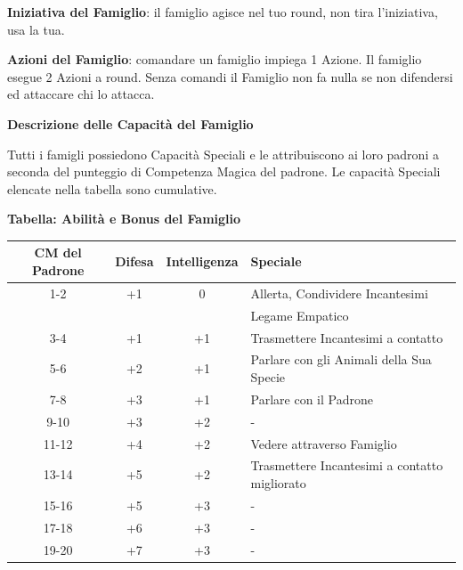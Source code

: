 \begin{multicols}{2}
\textbf{Iniziativa del Famiglio}: il famiglio agisce nel tuo round, non tira l'iniziativa, usa la tua.

\textbf{Azioni del Famiglio}: comandare un famiglio impiega 1 Azione. Il famiglio esegue 2 Azioni a round. Senza comandi il Famiglio non fa nulla se non difendersi ed attaccare chi lo attacca.

\textbf{Descrizione delle Capacità del Famiglio}

Tutti i famigli possiedono Capacità Speciali e le attribuiscono ai loro padroni a seconda del punteggio di Competenza Magica del padrone. Le capacità Speciali elencate nella tabella sono cumulative.

\end{multicols}

\textbf{Tabella: Abilità e Bonus del Famiglio}

\medskip
{

\noindent\begin{tabularx}{0.98\textwidth}{cccX}
\textbf{CM del Padrone} & \textbf{Difesa} & \textbf{Intelligenza} & \textbf{Speciale}\\
\toprule
1-2 & +1 & 0 & Allerta, Condividere Incantesimi\\
& && Legame Empatico\\
3-4 & +1 & +1 & Trasmettere Incantesimi a contatto\\
5-6 & +2 & +1 & Parlare con gli Animali della Sua Specie\\
7-8 & +3 & +1 & Parlare con il Padrone\\
9-10 & +3 & +2 & -\\
11-12 & +4 & +2 & Vedere attraverso Famiglio\\
13-14 & +5 & +2 & Trasmettere Incantesimi a contatto migliorato\\
15-16 & +5 & +3 & -\\
17-18 & +6 & +3 & -\\
19-20 & +7 & +3 & -
\end{tabularx}}


